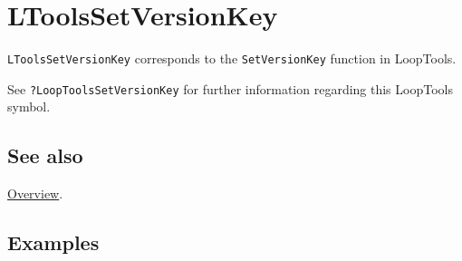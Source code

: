 \documentclass[../FeynHelpersManual.tex]{subfiles}
\begin{document}
\hypertarget{ltoolssetversionkey}{
\section{LToolsSetVersionKey}\label{ltoolssetversionkey}}

\texttt{LToolsSetVersionKey} corresponds to the \texttt{SetVersionKey}
function in LoopTools.

See \texttt{?LoopTools\textasciigrave SetVersionKey} for further
information regarding this LoopTools symbol.

\subsection{See also}

\hyperlink{toc}{Overview}.

\subsection{Examples}
\end{document}
